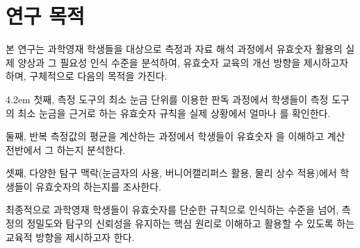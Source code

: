 \section{연구 목적}

본 연구는 과학영재 학생들을 대상으로 측정과 자료 해석 과정에서
유효숫자 활용의 실제 양상과 그 필요성 인식 수준을 분석하여,
유효숫자 교육의 개선 방향을 제시하고자 하며, 구체적으로 다음의 목적을 가진다.

\vspace*{20pt} \begin{hangblock}{4.2em}
첫째, 측정 도구의 최소 눈금 단위를 이용한 판독 과정에서 학생들이 측정 도구의
최소 눈금을 근거로 하는 유효숫자 규칙을
실제 상황에서 얼마나 를 확인한다.

둘째, 반복 측정값의 평균을 계산하는 과정에서 학생들이 유효숫자
을 이해하고 계산 전반에서 그 하는지 분석한다.

셋째, 다양한 탐구 맥락(눈금자의 사용, 버니어캘리퍼스 활용, 물리 상수 적용)에서
학생들이 유효숫자의 하는지를 조사한다.
\end{hangblock} \vspace*{20pt}

최종적으로 과학영재 학생들이 유효숫자를 단순한 규칙으로 인식하는 수준을 넘어,
측정의 정밀도와 탐구의 신뢰성을 유지하는 핵심 원리로 이해하고 활용할 수 있도록 하는
교육적 방향을 제시하고자 한다.